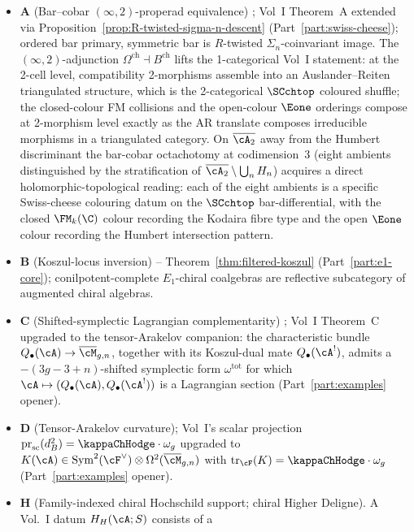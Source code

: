 \begin{itemize}\setlength\itemsep{2pt}
\item \textbf{A} (Bar--cobar $(\infty,2)$-properad equivalence)
 ; Vol~I Theorem~A extended via
 Proposition~\ref{prop:R-twisted-sigma-n-descent}
 (Part~\ref{part:swiss-cheese}); ordered bar primary,
 symmetric bar is $R$-twisted $\Sigma_n$-coinvariant image.
 The $(\infty,2)$-adjunction $\Omega^{\mathrm{ch}} \dashv
 B^{\mathrm{ch}}$ lifts the 1-categorical Vol~I statement: at
 the 2-cell level, compatibility 2-morphisms assemble into an
 Auslander--Reiten triangulated structure, which is the
 2-categorical $\SCchtop$ coloured shuffle; the closed-colour
 FM collisions and the open-colour $\Eone$ orderings compose at
 2-morphism level exactly as the AR translate composes
 irreducible morphisms in a triangulated category. On
 $\overline{\cA_2}$ away from the Humbert discriminant the
 bar-cobar octachotomy at codimension~$3$ (eight ambients
 distinguished by the stratification of
 $\overline{\cA_2}\setminus\bigcup_n H_n$) acquires a direct
 holomorphic-topological reading: each of the eight ambients is
 a specific Swiss-cheese colouring datum on the $\SCchtop$
 bar-differential, with the closed $\FM_k(\C)$ colour recording
 the Kodaira fibre type and the open $\Eone$ colour recording
 the Humbert intersection pattern.
\item \textbf{B} (Koszul-locus inversion) --
 Theorem~\ref{thm:filtered-koszul} (Part~\ref{part:e1-core});
 conilpotent-complete $E_1$-chiral coalgebras are reflective
 subcategory of augmented chiral algebras.
\item \textbf{C} (Shifted-symplectic Lagrangian complementarity)
 ; Vol~I Theorem~C upgraded to the tensor-Arakelov
 companion: the characteristic bundle
 $Q_\bullet(\cA) \to \overline{\cM}_{g,n}$, together with its
 Koszul-dual mate $Q_\bullet(\cA^!)$, admits a
 $-(3g{-}3{+}n)$-shifted symplectic form $\omega^{\mathrm{tot}}$
 for which $\cA \mapsto (Q_\bullet(\cA), Q_\bullet(\cA^!))$ is
 a Lagrangian section
 (Part~\ref{part:examples} opener).
\item \textbf{D} (Tensor-Arakelov curvature); Vol~I's scalar projection
 $\operatorname{pr}_{\mathrm{sc}}(d_B^2) = \kappaChHodge\cdot\omega_g$ upgraded to
 $K(\cA) \in \operatorname{Sym}^2(\cF^\vee) \otimes
 \Omega^2(\overline{\cM}_{g,n})$ with
 $\operatorname{tr}_\cF(K) = \kappaChHodge\cdot\omega_g$
 (Part~\ref{part:examples} opener).
\item \textbf{H} (Family-indexed chiral Hochschild support; chiral
 Higher Deligne).  A Vol.~I datum $H_H(\cA;S)$ consists of a

\end{itemize}
